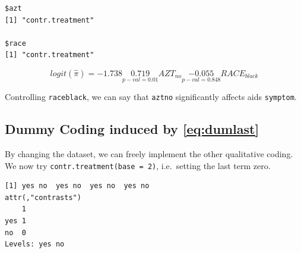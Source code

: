 \documentclass[]{book}
\newenvironment{Shaded}{\begin{snugshade}}{\end{snugshade}}
\newcommand{\DataTypeTok}[1]{\textcolor[rgb]{0.13,0.29,0.53}{#1}}
\newcommand{\DecValTok}[1]{\textcolor[rgb]{0.00,0.00,0.81}{#1}}
\newcommand{\KeywordTok}[1]{\textcolor[rgb]{0.13,0.29,0.53}{\textbf{#1}}}
\newcommand{\NormalTok}[1]{#1}
\newcommand{\OperatorTok}[1]{\textcolor[rgb]{0.81,0.36,0.00}{\textbf{#1}}}
\begin{document}
\begin{Shaded}
\end{Shaded}

\begin{verbatim}
$azt
[1] "contr.treatment"

$race
[1] "contr.treatment"
\end{verbatim}

\begin{equation}
logit(\hat\pi) = -1.738  \underset{p-val = 0.01}{0.719} AZT_{no} \underset{p-val = 0.848}{-0.055} RACE_{black}
\label{eq:dumfirstfit}
\end{equation}

Controlling \texttt{raceblack}, we can say that \texttt{aztno} significantly affects aids \texttt{symptom}.

\hypertarget{dummy-coding-induced-by}{%
\subsection{\texorpdfstring{Dummy Coding induced by \eqref{eq:dumlast}}{Dummy Coding induced by }}\label{dummy-coding-induced-by}}

By changing the dataset, we can freely implement the other qualitative coding. We now try \texttt{contr.treatment(base\ =\ 2)}, i.e.~setting the last term zero.

\begin{Shaded}
\end{Shaded}

\begin{verbatim}
[1] yes no  yes no  yes no  yes no 
attr(,"contrasts")
    1
yes 1
no  0
Levels: yes no
\end{verbatim}

\begin{Shaded}
\end{Shaded}
\end{document}
